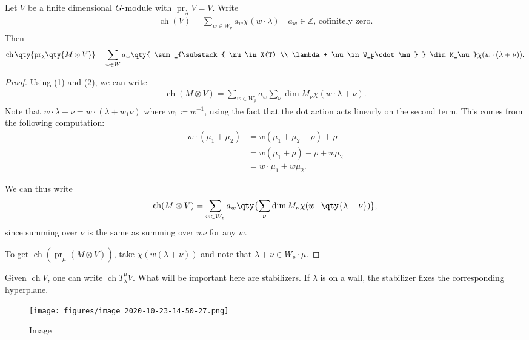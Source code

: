 \begin{proposition}[?]

Let \(V\) be a finite dimensional \(G{\hbox{-}}\)module with
\({\operatorname{pr}}_\lambda V = V\). Write
\begin{align*}  
\operatorname{ch}(V) = \sum_{w\in W_p} a_w \chi(w\cdot \lambda) \quad
a_w\in {\mathbb{Z}},\, \text{cofinitely zero}
.\end{align*}
Then
\begin{align*}  
\operatorname{ch}\qty{{\operatorname{pr}}_\lambda \qty{ M\otimes V } } = 
\sum_{w\in W} a_w  \qty{ \sum_{\substack{ \nu \in X(T) \\ \lambda + \nu \in W_p\cdot \mu} } \dim M_\nu } \chi(w\cdot (\lambda + \nu) )
.\end{align*}

\end{proposition}

\begin{proof}

Using (1) and (2), we can write
\begin{align*}  
\operatorname{ch}(M\otimes V) = 
\sum_{w\in W_p} a_w \sum_\nu \dim M_\nu \chi(w\cdot \lambda + \nu)
.\end{align*}
Note that \(w\cdot \lambda + \nu = w\cdot (\lambda + w_1 \nu)\) where
\(w_1 \coloneqq w^{-1}\), using the fact that the dot action acts
linearly on the second term. This comes from the following computation:
\begin{align*}  
w\cdot(\mu_1 + \mu_2)
&= w(\mu_1 + \mu_2 - \rho) + \rho \\
&= w(\mu_1 + \rho) - \rho + w\mu_2 \\
&= w\cdot \mu_1 + w\mu_2
.\end{align*}

We can thus write
\begin{align*}  
\operatorname{ch}(M\otimes V) = 
\sum_{w\in W_p} a_w \qty{ \sum_\nu \dim M_\nu \chi(w\cdot \qty{\lambda + \nu})}
,\end{align*}
since summing over \(\nu\) is the same as summing over \(w\nu\) for any
\(w\).

To get \(\operatorname{ch}({\operatorname{pr}}_\mu(M\otimes V))\), take
\(\chi(w(\lambda + \nu))\) and note that
\(\lambda + \nu \in W_p \cdot \mu\).

\end{proof}

\begin{remark}

Given \(\operatorname{ch}V\), one can write
\(\operatorname{ch}T_\lambda^\mu V\). What will be important here are
stabilizers. If \(\lambda\) is on a wall, the stabilizer fixes the
corresponding hyperplane.

\begin{figure}
\centering
\texttt{[image: figures/image\_2020-10-23-14-50-27.png]}
\caption{Image}
\end{figure}

\end{remark}

